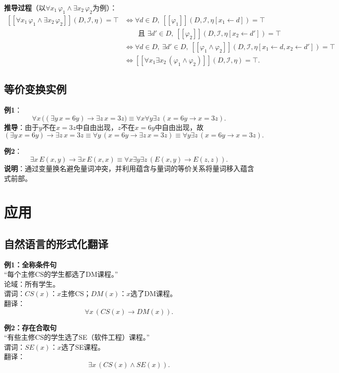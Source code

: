 \documentclass[UTF8,11pt,a4paper]{ctexbook}   %
\theoremstyle{definition}
\begin{document}
\textbf{推导过程}（以$\forall x_1\,\varphi_1\land\exists x_2\,\varphi_2$为例）：
\[
\begin{aligned}
{}[\![\forall x_1\,\varphi_1\land\exists x_2\,\varphi_2]\!](D,\mathcal{I},\eta)=\top
&\iff \forall d\in D,\ [\![\varphi_1]\!](D,\mathcal{I},\eta[x_1\leftarrow d])=\top\\
&\qquad\text{且 }\exists d'\in D,\ [\![\varphi_2]\!](D,\mathcal{I},\eta[x_2\leftarrow d'])=\top\\
&\iff \forall d\in D,\ \exists d'\in D,\ [\![\varphi_1\land\varphi_2]\!](D,\mathcal{I},\eta[x_1\leftarrow d,x_2\leftarrow d'])=\top\\
&\iff [\![\forall x_1\exists x_2\,(\varphi_1\land\varphi_2)]\!](D,\mathcal{I},\eta)=\top.
\end{aligned}
\]

\subsection{等价变换实例}

\textbf{例1}：
\[
\forall x\,\bigl((\exists y\,x=6y)\to\exists z\,x=3z\bigr)\equiv\forall x\forall y\exists z\,(x=6y\to x=3z).
\]
\textbf{推导}：由于$y$不在$x=3z$中自由出现，$z$不在$x=6y$中自由出现，故
\[
(\exists y\,x=6y)\to\exists z\,x=3z\equiv\forall y\,(x=6y\to\exists z\,x=3z)\equiv\forall y\exists z\,(x=6y\to x=3z).
\]

\textbf{例2}：
\[
\exists x\,E(x,y)\to\exists x\,E(x,x)\equiv\forall x\exists y\exists z\,(E(x,y)\to E(z,z)).
\]
\textbf{说明}：通过变量换名避免量词冲突，并利用蕴含与量词的等价关系将量词移入蕴含式前部。

\section{应用}

\subsection{自然语言的形式化翻译}

\textbf{例1：全称条件句}\\
“每个主修CS的学生都选了DM课程。”\\
论域：所有学生。\\
谓词：$CS(x)$：$x$主修CS；$DM(x)$：$x$选了DM课程。\\
翻译：
\[
\forall x\,(CS(x)\to DM(x)).
\]

\textbf{例2：存在合取句}\\
“有些主修CS的学生选了SE（软件工程）课程。”\\
谓词：$SE(x)$：$x$选了SE课程。\\
翻译：
\[
\exists x\,(CS(x)\land SE(x)).
\]
\end{document}
